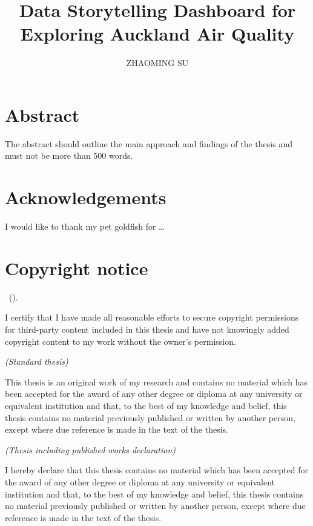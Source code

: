 \documentclass{aucklandthesis}
\author{ZHAOMING SU}
\title{Data Storytelling Dashboard for Exploring Auckland Air Quality}
\begin{document}

\titlepage

{\rm\tighttoc\doublespacing}

\hypertarget{abstract}{%
\chapter*{Abstract}\label{abstract}}

The abstract should outline the main approach and findings of the thesis and must not be more than 500 words.

\newpage

\hypertarget{acknowledgements}{%
\chapter*{Acknowledgements}\label{acknowledgements}}

I would like to thank my pet goldfish for \dots

\hypertarget{copyright-notice}{%
\chapter*{Copyright notice}\label{copyright-notice}}

\textcopyright { } \authorname~(\number\the\year).

I certify that I have made all reasonable efforts to secure copyright permissions for third-party content included in this thesis and have not knowingly added copyright content to my work without the owner's permission.

\newpage

\emph{(Standard thesis)}

This thesis is an original work of my research and contains no material which has been accepted for the award of any other degree or diploma at any university or equivalent institution and that, to the best of my knowledge and belief, this thesis contains no material previously published or written by another person, except where due reference is made in the text of the thesis.

\emph{(Thesis including published works declaration)}

I hereby declare that this thesis contains no material which has been accepted for the award of any other degree or diploma at any university or equivalent institution and that, to the best of my knowledge and belief, this thesis contains no material previously published or written by another person, except where due reference is made in the text of the thesis.
\end{document}
